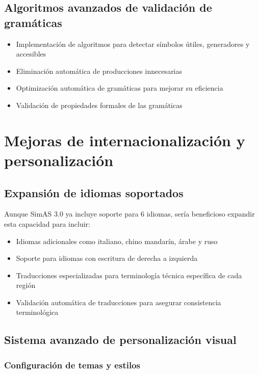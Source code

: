 \subsection{Algoritmos avanzados de validación de gramáticas}

\begin{itemize}
 \item Implementación de algoritmos para detectar símbolos útiles, generadores y accesibles
 \item Eliminación automática de producciones innecesarias
 \item Optimización automática de gramáticas para mejorar su eficiencia
 \item Validación de propiedades formales de las gramáticas
\end{itemize}

\section{Mejoras de internacionalización y personalización}

\subsection{Expansión de idiomas soportados}

Aunque SimAS 3.0 ya incluye soporte para 6 idiomas, sería beneficioso expandir esta capacidad para incluir:
\begin{itemize}
 \item Idiomas adicionales como italiano, chino mandarín, árabe y ruso
 \item Soporte para idiomas con escritura de derecha a izquierda
 \item Traducciones especializadas para terminología técnica específica de cada región
 \item Validación automática de traducciones para asegurar consistencia terminológica
\end{itemize}

\subsection{Sistema avanzado de personalización visual}

\subsubsection{Configuración de temas y estilos}

